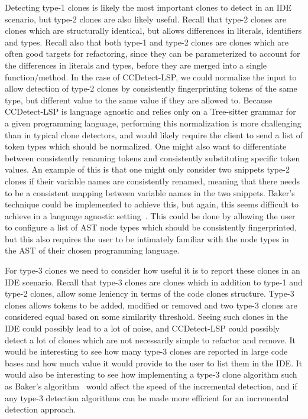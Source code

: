 Detecting type-1 clones is likely the most important clones to detect in an IDE scenario,
but type-2 clones are also likely useful. Recall that type-2 clones are clones which are
structurally identical, but allows differences in literals, identifiers and types. Recall
also that both type-1 and type-2 clones are clones which are often good targets for
refactoring, since they can be parameterized to account for the differences in literals
and types, before they are merged into a single function/method. In the case of
CCDetect-LSP, we could normalize the input to allow detection of type-2 clones by
consistently fingerprinting tokens of the same type, but different value to the same value
if they are allowed to. Because CCDetect-LSP is language agnostic and relies only on a
Tree-sitter grammar for a given programming language, performing this normalization is
more challenging than in typical clone detectors, and would likely require the client to
send a list of token types which should be normalized. One might also want to
differentiate between consistently renaming tokens and consistently substituting specific
token values. An example of this is that one might only consider two snippets type-2
clones if their variable names are consistently renamed, meaning that there needs to be a
consistent mapping between variable names in the two snippets. Baker's technique could be
implemented to achieve this, but again, this seems difficult to achieve in a language
agnostic setting~\cite{Bakerdup}. This could be done by allowing the user to configure a
list of AST node types which should be consistently fingerprinted, but this also requires
the user to be intimately familiar with the node types in the AST of their chosen
programming language.

For type-3 clones we need to consider how useful it is to report these clones in an IDE
scenario. Recall that type-3 clones are clones which in addition to type-1 and type-2
clones, allow some leniency in terms of the code clones structure. Type-3 clones allows
tokens to be added, modified or removed and two type-3 clones are considered equal based
on some similarity threshold. Seeing such clones in the IDE could possibly lead to a lot
of noise, and CCDetect-LSP could possibly detect a lot of clones which are not necessarily
simple to refactor and remove. It would be interesting to see how many type-3 clones are
reported in large code bases and how much value it would provide to the user to list them
in the IDE. It would also be interesting to see how implementing a type-3 clone algorithm
such as Baker's algorithm~\cite{BakerSparseDynamicProgramming} would affect the speed of
the incremental detection, and if any type-3 detection algorithms can be made more
efficient for an incremental detection approach.

